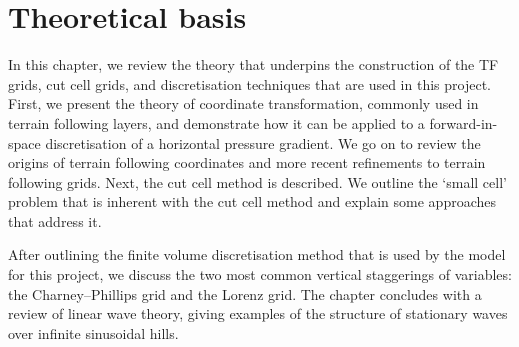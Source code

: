 \chapter{Theoretical basis}
\label{sec:theory}

In this chapter, we review the theory that underpins the construction of the TF grids, cut cell grids, and discretisation techniques that are used in this project.
First, we present the theory of coordinate transformation, commonly used in terrain following layers, and demonstrate how it can be applied to a forward-in-space discretisation of a horizontal pressure gradient.  We go on to review the origins of terrain following coordinates and more recent refinements to terrain following grids.  Next, the cut cell method is described.  We outline the `small cell' problem that is inherent with the cut cell method and explain some approaches that address it.

After outlining the finite volume discretisation method that is used by the model for this project, we discuss the two most common vertical staggerings of variables: the Charney--Phillips grid and the Lorenz grid.  The chapter concludes with a review of linear wave theory, giving examples of the structure of stationary waves over infinite sinusoidal hills.









